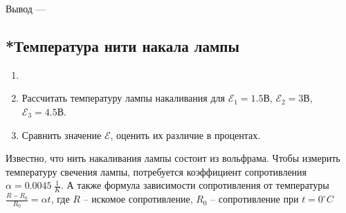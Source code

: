 Вывод --- \hrulefill 

\hrulefill 

\hrulefill 

\subsection{*Температура нити накала лампы}


\begin{enumerate}
	\item 
	\item Рассчитать температуру лампы накаливания для $\mathscr{E}_1 = 1.5 В$, $\mathscr{E}_2 = 3 В$, $\mathscr{E}_3 = 4.5 В$.
		\item Сравнить значение $\mathscr{E}$, оценить их различие в процентах.   

\end{enumerate}

Известно, что нить накаливания лампы состоит из вольфрама. Чтобы измерить температуру свечения лампы, потребуется коэффициент сопротивления $\alpha = 0.0045 ~\frac{1}{K}$. А также формула зависимости сопротивления от температуры $\frac{R - R_0}{R_0} = \alpha t$, где $R$ -- искомое сопротивление, $R_0$ -- сопротивление при $t = 0^\circ C$

\newpage